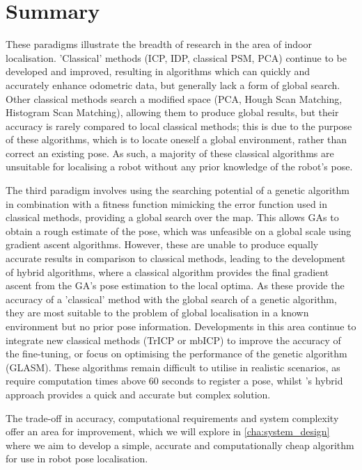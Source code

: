 \documentclass[authoryearcitations]{UoYCSproject}
\begin{document}
\section{Summary}
These paradigms illustrate the breadth of research in the area of indoor localisation. 'Classical' methods (ICP, IDP, classical PSM, PCA) continue to be developed and improved, resulting in algorithms which can quickly and accurately enhance odometric data, but generally lack a form of global search. Other classical methods search a modified space (PCA, Hough Scan Matching, Histogram Scan Matching), allowing them to produce global results, but their accuracy is rarely compared to local classical methods; this is due to the purpose of these algorithms, which is to locate oneself a global environment, rather than correct an existing pose. As such, a majority of these classical algorithms are unsuitable for localising a robot without any prior knowledge of the robot's pose.

The third paradigm involves using the searching potential of a genetic algorithm in combination with a fitness function mimicking the error function used in classical methods, providing a global search over the map. This allows GAs to obtain a rough estimate of the pose, which was unfeasible on a global scale using gradient ascent algorithms. However, these are unable to produce equally accurate results in comparison to classical methods, leading to the development of hybrid algorithms, where a classical algorithm provides the final gradient ascent from the GA's pose estimation to the local optima. As these provide the accuracy of a 'classical' method with the global search of a genetic algorithm, they are most suitable to the problem of global localisation in a known environment but no prior pose information. Developments in this area continue to integrate new classical methods (TrICP or mbICP) to improve the accuracy of the fine-tuning, or focus on optimising the performance of the genetic algorithm (GLASM). These algorithms remain difficult to utilise in realistic scenarios, as \citet{Chow2004-xc} require computation times above 60 seconds to register a pose, whilst \citet{Lenac2011-co}'s hybrid approach provides a quick and accurate but complex solution. 

The trade-off in accuracy, computational requirements and system complexity offer an area for improvement, which we will explore in \autoref{cha:system_design} where we aim to develop a simple, accurate and computationally cheap algorithm for use in robot pose localisation.
\end{document}
